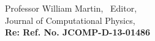 \begin{letter}{Professor William Martin, \  Editor,\\
    Journal of Computational Physics,\\
\textbf{Re: Ref. No. JCOMP-D-13-01486}}
%
%


\end{letter}

